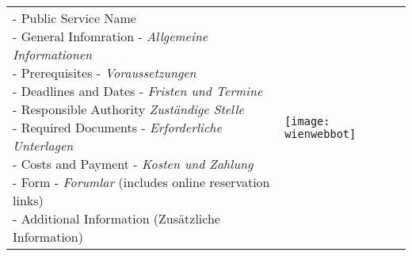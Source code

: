 \begin{table}[H]
	\begin{tabular} {l l}

\shortstack[l]{
- Public Service Name\\
- General Infomration - \textit{Allgemeine Informationen}\\
- Prerequisites - \textit{Voraussetzungen}\\
- Deadlines and Dates - \textit{Fristen und Termine}\\
- Responsible Authority \textit{Zuständige Stelle}\\
- Required Documents - \textit{Erforderliche Unterlagen}\\
- Costs and Payment - \textit{Kosten und Zahlung}\\
- Form - \textit{Forumlar} (includes online reservation links)\\
- Additional Information (Zusätzliche Information)
}

&
\texttt{[image: wienwebbot]}
	\end{tabular}	
\end{table}



%
%
%
%
%



